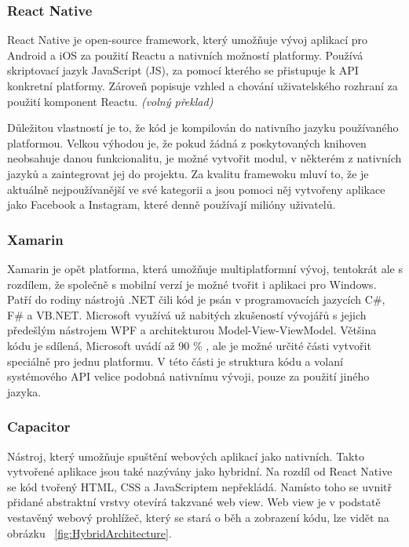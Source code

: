 \documentclass[
  glossaries,
]{kidiplom}
\begin{document}
\subsubsection{React Native}
React Native je open-source framework, který umožňuje vývoj aplikací pro Android a iOS za použití Reactu a nativních možností platformy. Používá skriptovací jazyk JavaScript (JS), za pomocí kterého se přistupuje k API konkretní platformy. Zároveň popisuje vzhled a chování  uživatelského rozhraní za použití komponent Reactu.
\cite{3}
\textit{(volný překlad)}

Důležitou vlastností je to, že kód je kompilován do nativního jazyku používaného platformou. Velkou výhodou je, že pokud žádná z poskytovaných knihoven neobsahuje danou funkcionalitu, je možné vytvořit modul, v některém z nativních jazyků a zaintegrovat jej do projektu. Za kvalitu framewoku mluví to, že je aktuálně nejpoužívanější ve své kategorii a jsou pomoci něj vytvořeny aplikace jako Facebook a Instagram, které denně používají milióny uživatelů.

\subsubsection{Xamarin}
Xamarin je opět platforma, která umožňuje multiplatformní vývoj, tentokrát ale s rozdílem, že společně s mobilní verzí je možné tvořit i aplikaci pro Windows. Patří do rodiny nástrojů .NET čili kód je psán v programovacích jazycích C\#, F\# a VB.NET. Microsoft využívá už nabitých zkušeností vývojářů s jejich předešlým nástrojem WPF a architekturou Model-View-ViewModel. Většina kódu je sdílená, Microsoft uvádí až 90 \% \cite{4}, ale je možné určité části vytvořit speciálně pro jednu platformu. V této části je struktura kódu a volaní systémového API velice podobná nativnímu vývoji, pouze za použití jiného jazyka.

\subsubsection{Capacitor}
Nástroj, který umožňuje spuštění webových aplikací jako nativních. Takto vytvořené aplikace jsou také nazývány jako hybridní. Na rozdíl od React Native se kód tvořený HTML, CSS a JavaScriptem nepřekládá. Namísto toho se uvnitř přidané abstraktní vrstvy otevírá takzvané web view. Web view je v podstatě vestavěný webový prohlížeč, který se stará o běh a zobrazení kódu, lze vidět na obrázku ~\ref{fig:HybridArchitecture}.  
\end{document}
